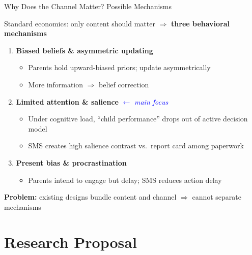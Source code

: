 \documentclass[aspectratio=169,11pt]{beamer}
\begin{document}
\begin{frame}{Why Does the Channel Matter? Possible Mechanisms}

Standard economics: only content should matter $\Rightarrow$ \textbf{three behavioral mechanisms}

\bigskip

\begin{enumerate}
    \item \textbf{Biased beliefs \& asymmetric updating}
    \begin{itemize}
        \item Parents hold upward-biased priors; update asymmetrically
        \item More information $\Rightarrow$ belief correction
    \end{itemize}

    \medskip

    \item \textbf{Limited attention \& salience} \textcolor{blue}{$\leftarrow$ \textit{main focus}}
    \begin{itemize}
        \item Under cognitive load, ``child performance'' drops out of active decision model \citep{gabaix2014sparsity}
        \item SMS creates high salience contrast vs.\ report card among paperwork \citep{bordalo2012salience}
    \end{itemize}

    \medskip

    \item \textbf{Present bias \& procrastination}
    \begin{itemize}
        \item Parents intend to engage but delay; SMS reduces action delay
    \end{itemize}
\end{enumerate}

\bigskip
\textbf{Problem:} existing designs bundle content and channel $\Rightarrow$ cannot separate mechanisms
\end{frame}

\section{Research Proposal}
\end{document}
